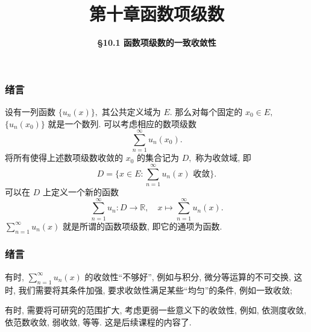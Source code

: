\everymath{\displaystyle}



\title[第十章\\
函数项级数]{\texorpdfstring{\LARGE \bfseries 第十章\quad 函数项级数}{第十章 函数项级数}} %
\author[\smaller \S 10.1\\
一致收敛性] %
{\Large \bfseries \S 10.1 函数项级数的一致收敛性}
\date{}





\begin{frame}

\titlepage %

\end{frame}



\begin{frame}
\frametitle{绪言}

设有一列函数 $\{u_n(x)\},$ 其公共定义域为 $E.$ 那么对每个固定的 $x_0 \in E,$ $\{u_n(x_0)\}$ 就是一个数列. 可以考虑相应的数项级数
\[
\sum_{n=1}^\infty u_n(x_0).
\]
将所有使得上述数项级数收敛的 $x_0$ 的集合记为 $D,$ 称为\alert{收敛域}, 即
\[
D = \{x \in E: \sum_{n=1}^\infty u_n(x) \text{ 收敛}\}.
\]
\pause
可以在 $D$ 上定义一个新的函数
\[
\sum_{n=1}^\infty u_n: D \to \mathbb{R}, \quad x \mapsto \sum_{n=1}^\infty u_n(x).
\]
$\sum_{n=1}^\infty u_n(x)$ 就是所谓的\alert{函数项级数}, 即它的通项为函数.

\end{frame}


\begin{frame}
\frametitle{绪言}

{
\larger[1]

有时,  $\sum_{n=1}^\infty u_n(x)$ 的收敛性``不够好'', 例如与积分, 微分等运算的不可交换,
\pause
这时, 我们需要将其条件加强, 要求收敛性满足某些``均匀''的条件, 例如一致收敛;

\pause
\vspace{2.5em}

有时,  需要将可研究的范围扩大, 考虑更弱一些意义下的收敛性,
\pause
例如, 依测度收敛, 依范数收敛, 弱收敛, 等等. 这是后续课程的内容了.
}

\end{frame}

